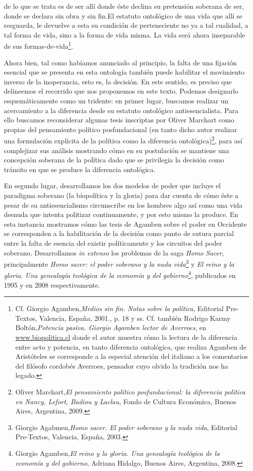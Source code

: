 de lo que se trata es de ser allí donde éste declina su pretensión soberana de ser, donde se declara sin obra y sin fin.El estatuto ontológico de una vida que allí se resguarda, le devuelve a esta su condición de perteneciente no ya a tal cualidad, a tal forma de vida, sino a la forma de vida misma. La vida será ahora inseparable de sus formas-de-vida\footnote{Cf. Giorgio Agamben,\emph{Medios sin fin. Notas sobre la política}, Editorial Pre-Textos, Valencia, España, 2001., p. 18 y ss. Cf. también Rodrigo Karmy Boltón,\emph{Potencia pasiva. Giorgio Agamben lector de Averroes}, en \href{http://www.biopolitica.cl/}{www.biopolitica.cl} donde el autor muestra cómo la lectura de la diferencia entre acto y potencia, en tanto diferencia ontológica, que realiza Agamben de Aristóteles se corresponde a la especial atención del italiano a los comentarios del filósofo cordobés Averroes, pensador cuyo olvido la tradición nos ha legado.}.

Ahora bien, tal como habíamos anunciado al principio, la falta de una fijación esencial que se presenta en esta ontología también puede habilitar el movimiento inverso de la inoperancia, esto es, la decisión. En este sentido, es preciso que delineemos el recorrido que nos proponemos en este texto. Podemos designarlo esquemáticamente como un tridente: en primer lugar, buscamos realizar un acercamiento a la diferencia desde su estatuto ontológico antiesencialista. Para ello buscamos reconsiderar algunas tesis inscriptas por Oliver Marchart como propias del pensamiento político posfundacional (en tanto dicho autor realizar una formulación explícita de la política como la diferencia ontológica)\footnote{Oliver Marchart,\emph{El pensamiento político posfundacional: la diferencia política en Nancy, Lefort, Badiou y Laclau}, Fondo de Cultura Económica, Buenos Aires, Argentina, 2009.}, para así complejizar sus análisis mostrando cómo en su postulación se mantiene una concepción soberana de la política dado que se privilegia la decisión como tránsito en que se produce la diferencia ontológica.

En segundo lugar, desarrollamos los dos modelos de poder que incluye el paradigma soberano (la biopolítica y la gloria) para dar cuenta de cómo éste a pesar de su antiesencialismo circunscribe en los hombres algo así como una vida desnuda que intenta politizar continuamente, y por esto mismo la produce. En esta instancia mostramos cómo las tesis de Agamben sobre el poder en Occidente se corresponden a la habilitación de la decisión como punto de sutura parcial entre la falta de esencia del existir políticamente y los circuitos del poder soberano. Desarrollamos \emph{in extenso} los problemas de la saga \emph{Homo Sacer}, principalmente \emph{Homo sacer: el poder soberano y la nuda vida}\footnote{Giorgio Agabmen,\emph{Homo sacer. El poder soberano y la nuda vida}, Editorial Pre-Textos, Valencia, España, 2003.} y \emph{El reino y la gloria. Una genealogía teológica de la economía y del gobierno}\footnote{Giorgio Agamben,\emph{El reino y la gloria. Una genealogía teológica de la economía y del gobierno}, Adriana Hidalgo, Buenos Aires, Argentina, 2008.}, publicados en 1995 y en 2008 respectivamente.

